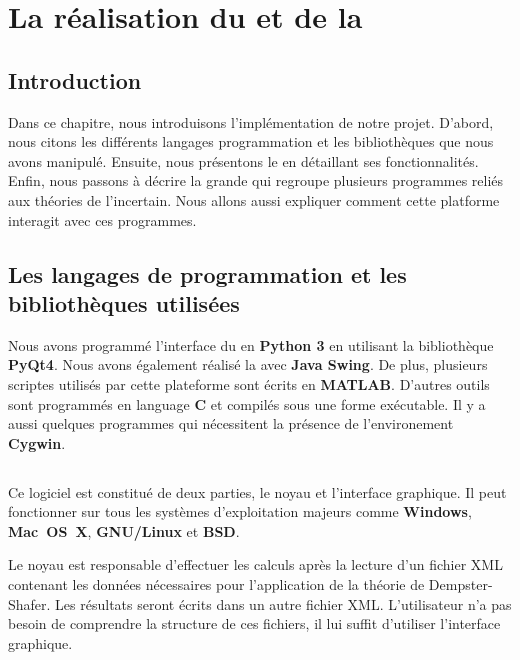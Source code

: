 \chapter{La réalisation du \appname et de la \platformename}
{}
\section*{Introduction}

Dans ce chapitre, nous introduisons l'implémentation de notre projet. D'abord, nous
citons les différents langages programmation et les bibliothèques que nous avons manipulé.
Ensuite, nous présentons le \appname en détaillant ses fonctionnalités. Enfin, nous passons
à décrire la grande \platformename qui regroupe plusieurs programmes reliés aux théories de
l'incertain. Nous allons aussi expliquer comment cette platforme interagit avec ces programmes.

\section{Les langages de programmation et les bibliothèques utilisées}

Nous avons programmé l'interface du \appname en \textbf{Python 3}
en utilisant la bibliothèque \textbf{PyQt4}. Nous avons également réalisé la \platformename
avec \textbf{Java Swing}. De plus, plusieurs scriptes utilisés par cette
plateforme sont écrits en \textbf{MATLAB}. D'autres outils sont programmés en language
\textbf{C} et compilés sous une forme exécutable. Il y a aussi quelques programmes
qui nécessitent la présence de l'environement \textbf{Cygwin}.

\section{\appName}

Ce logiciel est constitué de deux parties, le noyau et l'interface graphique.
Il peut fonctionner sur tous les systèmes d'exploitation majeurs comme \textbf{Windows},
\textbf{\mbox{Mac OS X}}, \textbf{\mbox{GNU/Linux}} et \textbf{BSD}.

Le noyau est responsable d'effectuer les calculs après la lecture d'un fichier XML
contenant les données nécessaires pour l'application de la théorie de Dempster-Shafer.
Les résultats seront écrits dans un autre fichier XML. L'utilisateur n'a pas besoin
de comprendre la structure de ces fichiers, il lui suffit d'utiliser l'interface
graphique.


